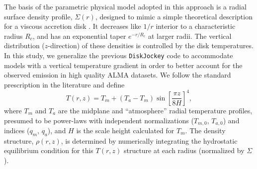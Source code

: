 \documentclass[twocolumn]{aastex61}
\begin{document}
The basis of the parametric physical model adopted in this approach is a radial surface density profile, $\Sigma(r)$, designed to mimic a simple theoretical description for a viscous accretion disk \citep{lyndenbell74,hartmann98}.  It decreases like $1/r$ interior to a characteristic radius $R_c$, and has an exponential taper $e^{-r/R_c}$ at larger radii.  The vertical distribution ($z$-direction) of these densities is controlled by the disk temperatures.  In this study, we generalize the previous {\tt DiskJockey} code to accommodate models with a vertical temperature gradient in order to better account for the observed emission in high quality ALMA datasets.  We follow the standard prescription in the literature \citep{dartois03,andrews12,rosenfeld13a} and define
\begin{equation}
	T(r, z) = T_m + (T_a - T_m)  \sin \left [ \frac{\pi z}{8 H} \right ]^4,
\end{equation}
where $T_m$ and $T_a$ are the midplane and ``atmosphere'' radial temperature profiles, presumed to be power-laws with independent normalizations ($T_{m,0}$, $T_{a,0}$) and indices ($q_m$, $q_a$), and $H$ is the scale height calculated for $T_m$.  The density structure, $\rho(r, z)$, is determined by numerically integrating the hydrostatic equilibrium condition for this $T(r,z)$ structure at each radius (normalized by $\Sigma$).
\end{document}
